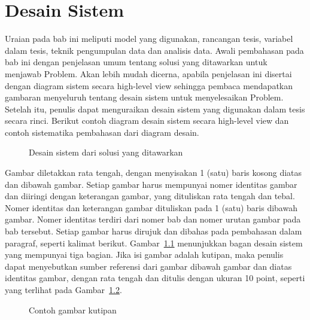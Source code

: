 \chapter{Desain Sistem}
\label{bab:desain-sistem}

Uraian pada bab ini meliputi model yang digunakan, rancangan tesis, variabel
dalam tesis, teknik pengumpulan data dan analisis data. Awali pembahasan pada
bab ini dengan penjelasan umum tentang solusi yang ditawarkan untuk menjawab
Problem. Akan lebih mudah dicerna, apabila penjelasan ini disertai dengan
diagram sistem secara high-level view sehingga pembaca mendapatkan gambaran
menyeluruh tentang desain sistem untuk menyelesaikan Problem. Setelah itu,
penulis dapat menguraikan desain sistem yang digunakan dalam tesis secara
rinci. Berikut contoh diagram desain sistem secara high-level view dan contoh
sistematika pembahasan dari diagram desain.

\begin{figure}[h]
  \centering
  \caption{Desain sistem dari solusi yang ditawarkan}
  \label{fig:desain-sistem}
\end{figure}

Gambar diletakkan rata tengah, dengan menyisakan 1 (satu) baris kosong diatas
dan dibawah gambar. Setiap gambar harus mempunyai nomer identitas gambar dan
diiringi dengan keterangan gambar, yang dituliskan rata tengah dan tebal. Nomer
identitas dan keterangan gambar dituliskan pada 1 (satu) baris dibawah gambar.
Nomer identitas terdiri dari nomer bab dan nomer urutan gambar pada bab
tersebut. Setiap gambar harus dirujuk dan dibahas pada pembahasan dalam
paragraf, seperti kalimat berikut. Gambar~\ref{fig:desain-sistem} menunjukkan
bagan desain sistem yang mempunyai tiga bagian. Jika isi gambar adalah kutipan,
maka penulis dapat menyebutkan sumber referensi dari gambar dibawah gambar dan
diatas identitas gambar, dengan rata tengah dan ditulis dengan ukuran 10 point,
seperti yang terlihat pada Gambar~\ref{fig:kutipan}.

\begin{figure}[h]
  \centering
  \caption{Contoh gambar kutipan}
  \label{fig:kutipan}
\end{figure}

